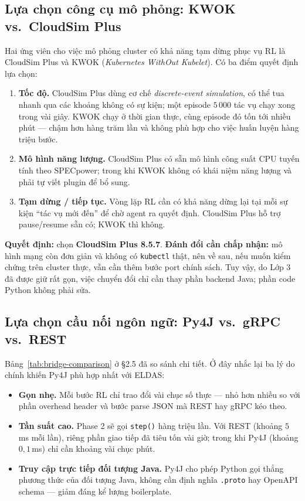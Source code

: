 \subsection{Lựa chọn công cụ mô phỏng: KWOK vs.\ CloudSim Plus}
\label{ssec:choose-sim}

Hai ứng viên cho việc mô phỏng cluster có khả năng tạm dừng phục vụ RL
là CloudSim Plus và KWOK (\textit{Kubernetes WithOut Kubelet}). Có ba
điểm quyết định lựa chọn:

\begin{enumerate}
  \item \textbf{Tốc độ.} CloudSim Plus dùng cơ chế
        \emph{discrete-event simulation}, có thể tua nhanh qua các
        khoảng không có sự kiện; một episode $5\,000$ tác vụ chạy
        xong trong vài giây. KWOK chạy ở thời gian thực, cùng
        episode đó tốn tới nhiều phút --- chậm hơn hàng trăm lần và
        không phù hợp cho việc huấn luyện hàng triệu bước.
  \item \textbf{Mô hình năng lượng.} CloudSim Plus có sẵn mô hình
        công suất CPU tuyến tính theo SPECpower; trong khi KWOK
        không có khái niệm năng lượng và phải tự viết plugin để bổ
        sung.
  \item \textbf{Tạm dừng / tiếp tục.} Vòng lặp RL cần có khả năng
        dừng lại tại mỗi sự kiện ``tác vụ mới đến'' để chờ agent ra
        quyết định. CloudSim Plus hỗ trợ pause/resume sẵn có; KWOK
        thì không.
\end{enumerate}

\textbf{Quyết định:} chọn \textbf{CloudSim Plus 8.5.7}.
\textbf{Đánh đổi cần chấp nhận:} mô hình mạng còn đơn giản và không có
\texttt{kubectl} thật, nên về sau, nếu muốn kiểm chứng trên cluster
thực, vẫn cần thêm bước port chính sách. Tuy vậy, do Lớp 3 đã được
giữ rất gọn, việc chuyển đổi chỉ cần thay phần backend Java; phần code
Python không phải sửa.

\subsection{Lựa chọn cầu nối ngôn ngữ: Py4J vs.\ gRPC vs.\ REST}
\label{ssec:choose-bridge}

Bảng~\ref{tab:bridge-comparison} ở §2.5 đã so sánh chi tiết. Ở đây
nhắc lại ba lý do chính khiến Py4J phù hợp nhất với ELDAS:
\begin{itemize}
  \item \textbf{Gọn nhẹ.} Mỗi bước RL chỉ trao đổi vài chục số
        thực --- nhỏ hơn nhiều so với phần overhead header và bước
        parse JSON mà REST hay gRPC kéo theo.
  \item \textbf{Tần suất cao.} Phase 2 sẽ gọi \texttt{step()} hàng
        triệu lần. Với REST (khoảng $5$\,ms mỗi lần), riêng phần
        giao tiếp đã tiêu tốn vài giờ; trong khi Py4J (khoảng
        $0{,}1$\,ms) chỉ cần khoảng vài chục phút.
  \item \textbf{Truy cập trực tiếp đối tượng Java.} Py4J cho phép
        Python gọi thẳng phương thức của đối tượng Java, không cần
        định nghĩa \texttt{.proto} hay OpenAPI schema --- giảm
        đáng kể lượng boilerplate.
\end{itemize}


